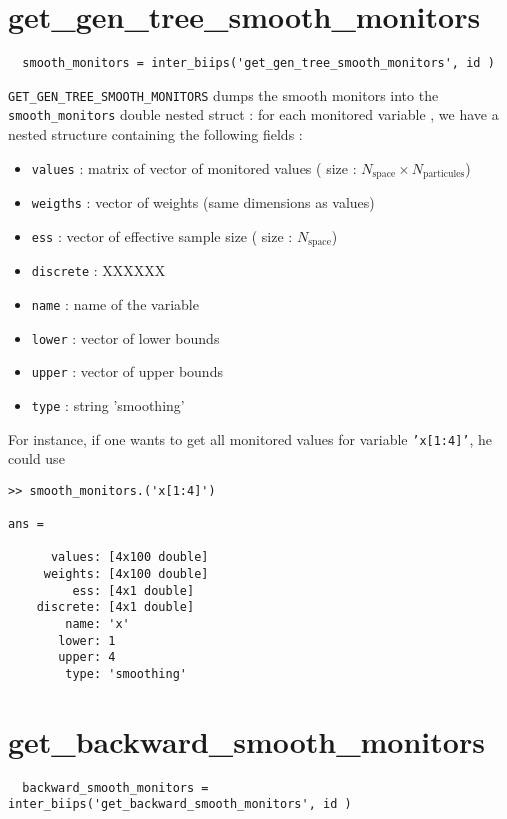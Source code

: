 \documentclass[11pt]{article}
\begin{document}
 \section{get\_gen\_tree\_smooth\_monitors}
 
 \begin{lstlisting}
  smooth_monitors = inter_biips('get_gen_tree_smooth_monitors', id )
 \end{lstlisting}
 
 \texttt{GET\_GEN\_TREE\_SMOOTH\_MONITORS} dumps the smooth monitors into the \texttt{smooth\_monitors} double nested struct : for each monitored variable , we have
  a nested structure containing the following fields :

  \begin{itemize}
   \item \texttt{values} : matrix of vector of monitored values ( size : $N_{\mbox{space}} \times N_{\mbox{particules}}$)
   \item \texttt{weigths} : vector of weights (same dimensions as values)
   \item \texttt{ess} : vector of effective  sample size ( size : $N_{\mbox{space}}$)
   \item \texttt{discrete} : XXXXXX
   \item \texttt{name} : name of the variable
   \item \texttt{lower} : vector of lower bounds
   \item \texttt{upper} : vector of upper bounds
   \item \texttt{type} : string 'smoothing' 
   \end{itemize}

  For instance, if one wants to get all monitored values for variable \texttt{'x[1:4]'}, he could use
 \begin{lstlisting}
>> smooth_monitors.('x[1:4]')

ans = 

      values: [4x100 double]
     weights: [4x100 double]
         ess: [4x1 double]
    discrete: [4x1 double]
        name: 'x'
       lower: 1
       upper: 4
        type: 'smoothing'
 \end{lstlisting}

 \section{get\_backward\_smooth\_monitors}
 
 \begin{lstlisting}
  backward_smooth_monitors = inter_biips('get_backward_smooth_monitors', id )
 \end{lstlisting}
 
\end{document}
